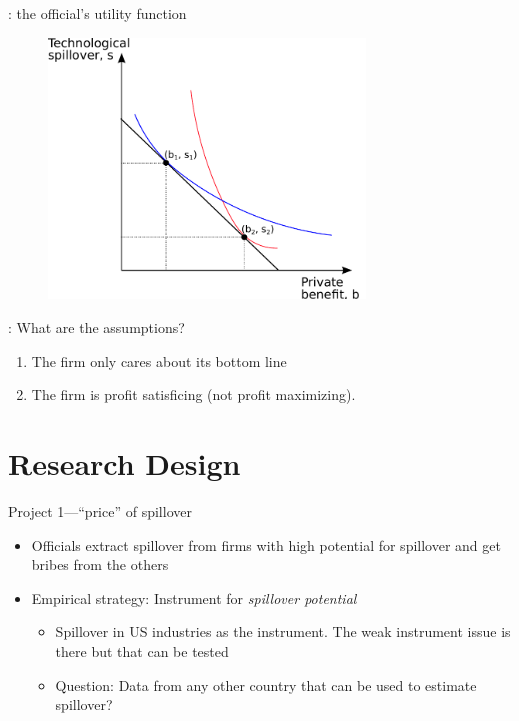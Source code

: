 \documentclass[14pt]{beamer}
\begin{document}
\begin{frame}{\secname: the official's utility function}
\begin{figure}
	\centering
    \includegraphics[width=0.75\textwidth, height=0.75\textheight,keepaspectratio]{../figure/indifference_curve}
    \label{fig:indifference_curve}
\end{figure}
\end{frame}

\begin{frame}{\secname: What are the assumptions?}
\begin{enumerate}
\item<1-> The firm only cares about its bottom line
\item<2-> The firm is profit satisficing (not profit maximizing).
\end{enumerate}
\end{frame}

\section{Research Design}

\begin{frame}{Project 1---``price'' of spillover}
\begin{itemize}[<+->]
\item Officials extract spillover from firms with high potential for spillover and get bribes from the others
\item Empirical strategy: Instrument for \textit{spillover potential}
\begin{itemize}[<+->]
\item Spillover in US industries as the instrument. The weak instrument issue is there but that can be tested
\item Question: Data from any other country that can be used to estimate spillover?
\end{itemize}
\end{itemize}
\end{frame}
\end{document}
